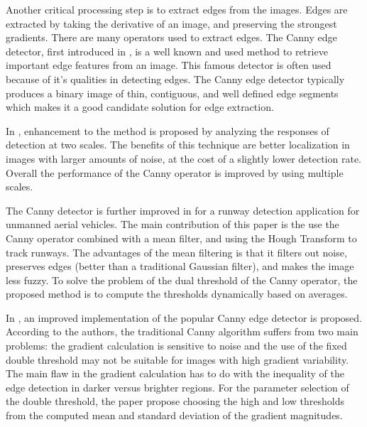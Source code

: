 Another critical processing step is to extract edges from the images. Edges are extracted by taking the derivative of an image, and preserving the strongest gradients. There are many operators used to extract edges. The Canny edge detector, first introduced in \cite{1986_canny_edge_detection}, is a well known and used method to retrieve important edge features from an image. This famous detector is often used because of it's qualities in detecting edges. The Canny edge detector typically produces a binary image of thin, contiguous, and well defined edge segments which makes it a good candidate solution for edge extraction. 

In \cite{Canny_edge_detection_enhancement_scale_multiplication}, enhancement to the method is proposed by analyzing the responses of detection at two scales. The benefits of this technique are better localization in images with larger amounts of noise, at the cost of a slightly lower detection rate. Overall the performance of the Canny operator is improved by using multiple scales.

The Canny detector is further improved in \cite{Runway_detection_tracking_unmanned} for a runway detection application for unmanned aerial vehicles. The main contribution of this paper is the use the Canny operator combined with a mean filter, and using the Hough Transform to track runways. The advantages of the mean filtering is that it filters out noise, preserves edges (better than a traditional Gaussian filter), and makes the image less fuzzy. To solve the problem of the dual threshold of the Canny operator, the proposed method is to compute the thresholds dynamically based on averages.

In \cite{Improved_Canny_Edge_Detection}, an improved implementation of the popular Canny edge detector is proposed. According to the authors, the traditional Canny algorithm suffers from two main	problems: the gradient calculation is sensitive to noise and the use of the fixed double threshold may not be suitable for images with high gradient variability. The main flaw in the gradient calculation has to do with the inequality of the edge detection in darker versus brighter regions. For the parameter selection of the double threshold, the paper propose choosing the high and low thresholds from the computed mean and standard deviation of the gradient magnitudes.

